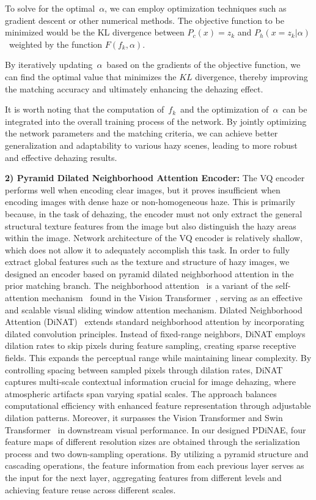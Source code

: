\documentclass[journal]{IEEEtran}
\begin{document}
To solve for the optimal $\alpha$, we can employ optimization techniques such as gradient descent or other numerical methods. The objective function to be minimized would be the KL divergence between $P_{c}(x) = z_{k}$ and $P_{h}(x = z_{k} | \alpha) $ weighted by  the function $F(f_{k}, \alpha)$.

By iteratively updating $\alpha$ based on the gradients of the objective function, we can find the optimal value that minimizes the $KL$ divergence, thereby improving the matching accuracy and ultimately enhancing the dehazing effect.

It is worth noting that the computation of $f_{k}$ and the optimization of $\alpha$ can be integrated into the overall training process of the network. By jointly optimizing the network parameters and the matching criteria, we can achieve better generalization and adaptability to various hazy scenes, leading to more robust and effective dehazing results.

	{\bf{2) Pyramid Dilated Neighborhood Attention Encoder:}} The VQ encoder performs well when encoding clear images, but it proves insufficient when encoding images with dense haze or non-homogeneous haze. This is primarily because, in the task of dehazing, the encoder must not only extract the general structural texture features from the image but also distinguish the hazy areas within the image. Network architecture of the VQ encoder is relatively shallow, which does not allow it to adequately accomplish this task. In order to fully extract global features such as the texture and structure of hazy images, we designed an encoder based on pyramid dilated neighborhood attention in the prior matching branch. The neighborhood attention~\cite{hassani2023neighborhood} is a variant of the self-attention mechanism~\cite{vaswani2017attention} found in the Vision Transformer~\cite{dosovitskiy2020image}, serving as an effective and scalable visual sliding window attention mechanism. Dilated Neighborhood Attention (DiNAT)~\cite{hassani2022dilated} extends standard neighborhood attention by incorporating dilated convolution principles. Instead of fixed-range neighbors, DiNAT employs dilation rates to skip pixels during feature sampling, creating sparse receptive fields. This expands the perceptual range while maintaining linear complexity. By controlling spacing between sampled pixels through dilation rates, DiNAT captures multi-scale contextual information crucial for image dehazing, where atmospheric artifacts span varying spatial scales. The approach balances computational efficiency with enhanced feature representation through adjustable dilation patterns. Moreover, it surpasses the Vision Transformer and Swin Transformer~\cite{liu2021swin} in downstream visual performance. In our designed PDiNAE, four feature maps of different resolution sizes are obtained through the serialization process and two down-sampling operations. By utilizing a pyramid structure and cascading operations, the feature information from each previous layer serves as the input for the next layer, aggregating features from different levels and achieving feature reuse across different scales.
\end{document}
